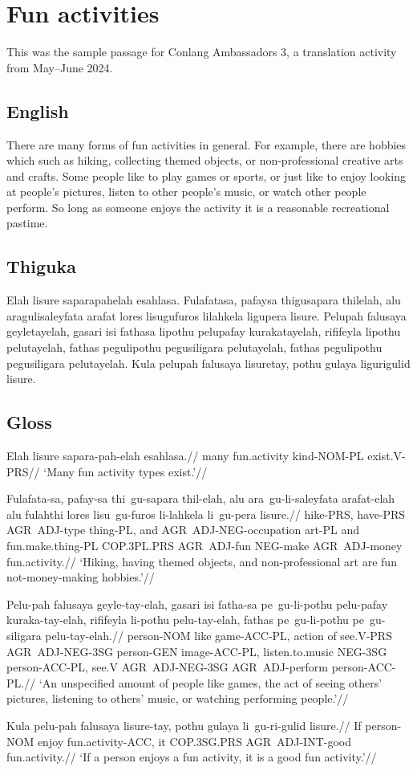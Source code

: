 
\section{Fun activities}
This was the sample passage for Conlang Ambassadors 3, a translation activity from May--June 2024.
\subsection*{English}
There are many forms of fun activities in general.
For example, there are hobbies which such as hiking, collecting themed objects, or non-professional creative arts and crafts.
Some people like to play games or sports, or just like to enjoy looking at people's pictures, listen to other people's music, or watch other people perform.
So long as someone enjoys the activity it is a reasonable recreational pastime.

\subsection*{Thiguka}
Elah lisure saparapahelah esahlasa.
Fulafatasa, pafaysa thigusapara thilelah, alu aragulisaleyfata arafat lores lisugufuros lilahkela ligupera lisure.
Pelupah falusaya geyletayelah, gasari isi fathasa lipothu pelupafay kurakatayelah, rififeyla lipothu pelutayelah, fathas pegulipothu pegusiligara pelutayelah, fathas pegulipothu pegusiligara pelutayelah.
Kula pelupah falusaya lisuretay, pothu gulaya ligurigulid lisure.

\subsection*{Gloss}
\ex
\begingl
\gla Elah lisure sapara-pah-elah esahlasa.//
\glb many fun.activity kind-NOM-PL exist.V-PRS//
\glft `Many fun activity types exist.'//
\endgl
\xe

\ex
\begingl
\gla  Fulafata-sa, pafay-sa thi~gu-sapara thil-elah, alu ara~gu-li-saleyfata arafat-elah alu fulahthi lores lisu~gu-furos li-lahkela li~gu-pera lisure.//
\glb  hike-PRS, have-PRS AGR~ADJ-type thing-PL, and AGR~ADJ-NEG-occupation art-PL and fun.make.thing-PL COP.3PL.PRS AGR~ADJ-fun NEG-make AGR~ADJ-money fun.activity.//
\glft `Hiking, having themed objects, and non-professional art are fun not-money-making hobbies.'//
\endgl
\xe

\ex
\begingl
\gla  Pelu-pah falusaya geyle-tay-elah, gasari isi fatha-sa pe~gu-li-pothu pelu-pafay kuraka-tay-elah, rififeyla li-pothu pelu-tay-elah, fathas pe~gu-li-pothu pe~gu-siligara pelu-tay-elah.//
\glb   person-NOM like game-ACC-PL, action of see.V-PRS AGR~ADJ-NEG-3SG person-GEN image-ACC-PL, listen.to.music NEG-3SG person-ACC-PL, see.V AGR~ADJ-NEG-3SG AGR~ADJ-perform person-ACC-PL.//
\glft `An unspecified amount of people like games, the act of seeing others' pictures, listening to others' music, or watching performing people.'//
\endgl
\xe

\ex
\begingl
    \gla Kula pelu-pah   falusaya lisure-tay,       pothu gulaya      li~gu-ri-gulid   lisure.//
    \glb If   person-NOM enjoy    fun.activity-ACC, it    COP.3SG.PRS AGR~ADJ-INT-good fun.activity.//
    \glft `If a person enjoys a fun activity, it is a good fun activity.'//
\endgl
\xe


